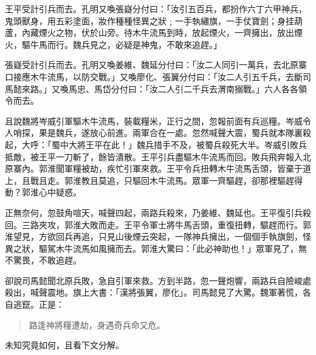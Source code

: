 王平受計引兵而去。孔明又喚張嶷分付曰：「汝引五百兵，都扮作六丁六甲神兵，鬼頭獸身，用五彩塗面，妝作種種怪異之狀﹔一手執繡旗，一手仗寶劍；身挂葫蘆，內藏煙火之物，伏於山旁。待木牛流馬到時，放起煙火，一齊擁出，放出煙火，驅牛馬而行。魏兵見之，必疑是神鬼，不敢來追趕。」

張嶷受計引兵而去。孔明又喚姜維、魏延分付曰：「汝二人同引一萬兵，去北原寨口接應木牛流馬，以防交戰。」又喚廖化、張翼分付曰：「汝二人引五千兵，去斷司馬懿來路。」又喚馬忠、馬岱分付曰：「汝二人引二千兵去渭南搦戰。」六人各各領令而去。

且說魏將岑威引軍驅木牛流馬，裝載糧米，正行之間，忽報前面有兵巡糧。岑威令人哨探，果是魏兵，遂放心前進。兩軍合在一處。忽然喊聲大震，蜀兵就本隊裏殺起，大呼：「蜀中大將王平在此！」魏兵措手不及，被蜀兵殺死大半。岑威引敗兵抵敵，被王平一刀斬了，餘皆潰散。王平引兵盡驅木牛流馬而回。敗兵飛奔報入北原寨內。郭淮聞軍糧被劫，疾忙引軍來救。王平令兵扭轉木牛流馬舌頭，皆棄于道上，且戰且走。郭淮教且莫追，只驅回木牛流馬。眾軍一齊驅趕，卻那裡驅趕得動？郭淮心中疑惑。

正無奈何，忽鼓角喧天，喊聲四起，兩路兵殺來，乃姜維、魏延也。王平復引兵殺回。三路夾攻，郭淮大敗而走。王平令軍士將牛馬舌頭，重復扭轉，驅趕而行。郭淮望見，方欲回兵再追，只見山後煙云突起，一隊神兵擁出，一個個手執旗劍，怪異之狀，驅駕木牛流馬如風擁而去。郭淮大驚曰：「此必神助也！」眾軍見了，無不驚畏，不敢追趕。

卻說司馬懿聞北原兵敗，急自引軍來救。方到半路，忽一聲炮響，兩路兵自險峻處殺出，喊聲震地。旗上大書：「漢將張翼，廖化」。司馬懿見了大驚。魏軍著慌，各自逃竄。正是：

\begin{quote}
路逢神將糧遭劫，身遇奇兵命又危。
\end{quote}

未知究竟如何，且看下文分解。
